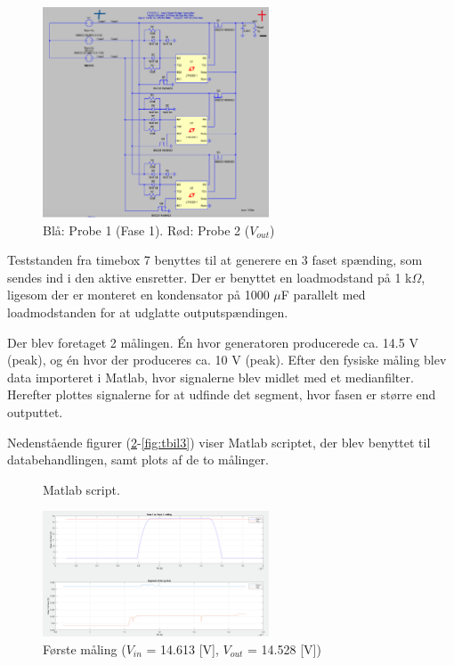 \begin{figure}[h]
  \centering
  \includegraphics[width=0.6\textwidth]{tbil1.png}
  \caption{Blå: Probe 1 (Fase 1). Rød: Probe 2 ($V_{out}$)}
  \label{fig:jbil1}
\end{figure}

Teststanden fra timebox 7 benyttes til at generere en 3 faset spænding, som sendes ind i den aktive ensretter. Der er benyttet en loadmodstand på 1 k$\Omega$, ligesom der er monteret en kondensator på 1000 $\mu$F parallelt med loadmodstanden for at udglatte outputspændingen. 

Der blev foretaget 2 målingen. Én hvor generatoren producerede ca. 14.5 V (peak), og én hvor der produceres ca. 10 V (peak). Efter den fysiske måling blev data importeret i Matlab, hvor signalerne blev midlet med et medianfilter. Herefter plottes signalerne for at udfinde det segment, hvor fasen er større end outputtet.

Nedenstående figurer (\ref{fig:matcode2}-\ref{fig:tbil3}) viser Matlab scriptet, der blev benyttet til databehandlingen, samt plots af de to målinger.
\clearpage
\begin{figure}[h]
  \centering


  
  \caption{Matlab script.}
  \label{fig:matcode2}
\end{figure}
\clearpage
\begin{figure}[h]
  \centering
  \includegraphics[width=0.6\textwidth]{tbil2.png}
  \caption{Første måling ($V_{in}$ = 14.613 [V], $V_{out}$ = 14.528 [V])}
  \label{fig:tbil2}
\end{figure}

